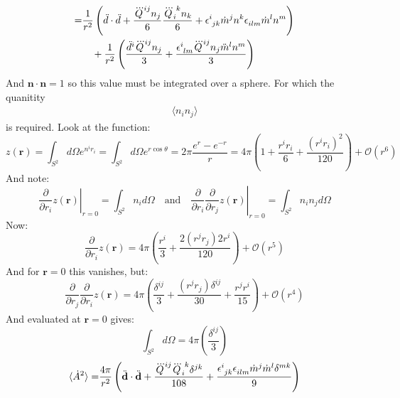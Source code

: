 \documentclass[12pt,a4]{article}
\begin{document}
\begin{enumerate}
\begin{enumerate}
\begin{align*}
          = &\frac{1}{r^2}\left(\ddot{d} \cdot \ddot{d} + \frac{\dddot{Q}^{ij}n_j}{6} \frac{\tensor{\dddot{Q}}{_i^k}n_k}{6} + \tensor{\epsilon}{^i_j_k}\dot m^j n^k \tensor{\epsilon}{_i_l_m}\dot m^l n^m\right) \\
            &\quad + \frac{1}{r^2}\left(\frac{\ddot{d}^i \dddot{Q}^{ij}n_j}{3} + \frac{ \tensor{\epsilon}{^i_l_m}\dddot{Q}^{ij}n_j \ddot m^l n^m}{3}  \right)
        \end{align*}
        And $\mathbf{n} \cdot \mathbf{n} = 1$ so this value must be integrated over a sphere.
        For which the quanitity
        \begin{align*}
          \langle n_i n_j\rangle %
        \end{align*}
        is required.
        Look at the function:
        \begin{equation*}
          z(\mathbf{r}) = \int_{S^2} d \Omega e^{n^i r_i} = \int_{S^2} d \Omega e^{r \cos \theta}= 2 \pi \frac{e^{r} - e^{-r}}{r} = 4 \pi\left(1 +\frac{r^ir_i}{6}+\frac{(r^ir_i)^2}{120}\right) + \mathcal{O}(r^6)
        \end{equation*}
        And note:
        \begin{equation*}
          \left.\frac{\partial}{\partial r_i}z(\mathbf{r})\right|_{r = 0} = \int_{S^2} n_i d \Omega \quad \text{and} \quad \left.\frac{\partial}{\partial r_i}\frac{\partial}{\partial r_j}z(\mathbf{r})\right|_{r = 0} = \int_{S^2} n_i n_j d \Omega
        \end{equation*}
        Now:
        \begin{equation*}
          \frac{\partial}{\partial r_i}z(\mathbf{r}) = 4 \pi\left(\frac{r^i}{3}+\frac{2(r^jr_j)2r^i}{120}\right) + \mathcal{O}(r^5)
        \end{equation*}
        And for $\mathbf{r} = 0$ this vanishes, but:
        \begin{equation*}
          \frac{\partial}{\partial r_j}\frac{\partial}{\partial r_i}z(\mathbf{r}) = 4 \pi\left(\frac{\delta^{ij}}{3}+\frac{(r^jr_j)\delta^{ij}}{30}+\frac{r^jr^i}{15}\right) + \mathcal{O}(r^4)
        \end{equation*}
        And evaluated at $\mathbf{r} = 0$ gives:
        \begin{equation*}
          \int_{S^2} d \Omega = 4 \pi\left(\frac{\delta^{ij}}{3}\right)
        \end{equation*}
        \begin{align*}
          \langle\dot A^2\rangle
          = &\frac{4\pi}{r^2}\left(\ddot{\mathbf{d}} \cdot \ddot{\mathbf{d}} + \frac{\dddot{Q}^{ij}\tensor{\dddot{Q}}{_i^k} \delta^{jk}}{108} + \frac{\tensor{\epsilon}{^i_j_k}\tensor{\epsilon}{_i_l_m}\dot m^j \dot m^l \delta^{mk}}{9}\right) \\

\end{align*}
\end{enumerate}
\end{enumerate}
\end{document}
